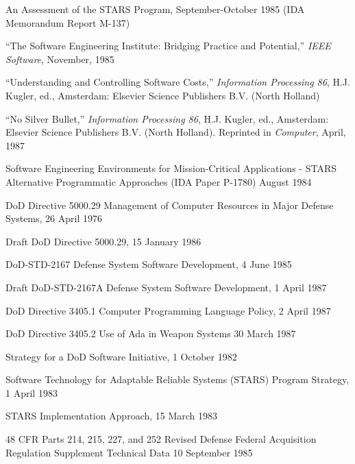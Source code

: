 \documentclass[12pt,final]{article}
\begin{document}
\begin{description}[leftmargin=2in,style=sameline]
    \item [Bailey, Elizabeth, \textit{et al}] An Assessment of the STARS Program, September-October 1985 (IDA Memorandum Report M-137)

    \item [Barbacci, M.R. \textit{et al}] “The Software Engineering Institute: Bridging Practice
        and Potential,” \emph{IEEE Software}, November, 1985

    \item [Boehm, Barry W.] “Understanding and Controlling Software Costs,” \emph{Information Processing 86}, H.J. Kugler, ed., Amsterdam: Elsevier Science Publishers B.V. (North Holland)

    \item [Brocks, Frederick P.] “No Silver Bullet,” \emph{Information Processing 86}, H.J. Kugler, ed., Amsterdam: Elsevier Science Publishers B.V.  (North Holland). Reprinted in \emph{Computer}, April, 1987

    \item [DeMillo, Richard A., \textit{et al}] Software Engineering Environments for Mission-Critical Applications - STARS Alternative Programmatic Approaches (IDA Paper P-1780) August 1984

    \item [DoD]
        DoD Directive 5000.29 Management of Computer Resources in Major
        Defense Systems, 26 April 1976

        Draft DoD Directive 5000.29, 15 January
        1986

        DoD-STD-2167 Defense System Software Development, 4 June 1985

        Draft DoD-STD-2167A Defense System Software Development, 1 April 1987

        DoD Directive 3405.1 Computer Programming Language Policy, 2 April 1987

        DoD Directive 3405.2 Use of Ada in Weapon Systems 30 March 1987

        Strategy for a DoD Software Initiative, 1 October 1982

        Software Technology for Adaptable Reliable Systems (STARS) Program Strategy, 1
        April 1983

        STARS Implementation Approach, 15 March 1983

        48 CFR Parts 214, 215, 227, and 252 Revised Defense Federal Acquisition Regulation
        Supplement Technical Data 10 September 1985


\end{description}
\end{document}
